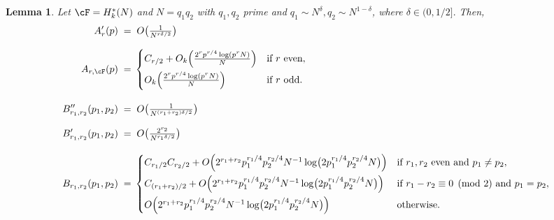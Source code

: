 \documentclass[11pt, reqno]{amsart}
\newtheorem{lemma}[theorem]{Lemma}
\theoremstyle{definition}
\theoremstyle{remark}
\numberwithin{equation}{section}
\begin{document}
\begin{lemma}\label{thm:q1q2infmom}
Let $\cF=H^*_k(N)$ and $N=q_1q_2$ with $q_1,q_2$ prime and $q_1\sim N^{\delta},q_2\sim N^{1-\delta}$, where $\delta \in (0,1/2].$ Then,
\footnotesize
\begin{align*}
A'_r(p) \;=\;&\; O\!\left(\tfrac{1}{N^{r\delta/2}} \right) \\[8pt]
A_{r,\cF}(p) \;=\;& 
\begin{cases}
  C_{r/2} + O_k\!\left(\tfrac{2^r p^{r/4}\log(p^rN)}{N}\right) 
    & \text{if $r$ even}, \\[6pt]
  O_k\!\left(\tfrac{2^r p^{r/4}\log(p^rN)}{N}\right) 
    & \text{if $r$ odd}.
\end{cases} \\[10pt]
B''_{r_1,r_2}(p_1,p_2) \;=\;&\; O\!\left(\tfrac{1}{N^{(r_1+r_2)\delta/2}} \right) \\[8pt]
B'_{r_1,r_2}(p_1,p_2) \;=\;&\; O\!\left(\tfrac{2^{r_2}}{N^{r_1\delta/2}}\right) \\[10pt]
B_{r_1,r_2}(p_1,p_2) \;=\;& 
\begin{cases}
  C_{r_1/2}C_{r_2/2} 
    + O\!\left( 2^{r_1+r_2}p_1^{r_1/4}p_2^{r_2/4}N^{-1}
      \log\!\big(2p_1^{r_1/4}p_2^{r_2/4}N\big)\right) 
    & \text{if $r_1,r_2$ even and $p_1 \neq p_2$}, \\[6pt]
  C_{(r_1+r_2)/2} 
    + O\!\left( 2^{r_1+r_2}p_1^{r_1/4}p_2^{r_2/4}N^{-1}
      \log\!\big(2p_1^{r_1/4}p_2^{r_2/4}N\big)\right) 
    & \text{if $r_1-r_2 \equiv 0 \pmod{2}$ and $p_1 = p_2$}, \\[6pt]
  O\!\left( 2^{r_1+r_2}p_1^{r_1/4}p_2^{r_2/4}N^{-1}
    \log\!\big(2p_1^{r_1/4}p_2^{r_2/4}N\big)\right) 
    & \text{otherwise}.
\end{cases}
\end{align*}

\end{lemma}
\end{document}
